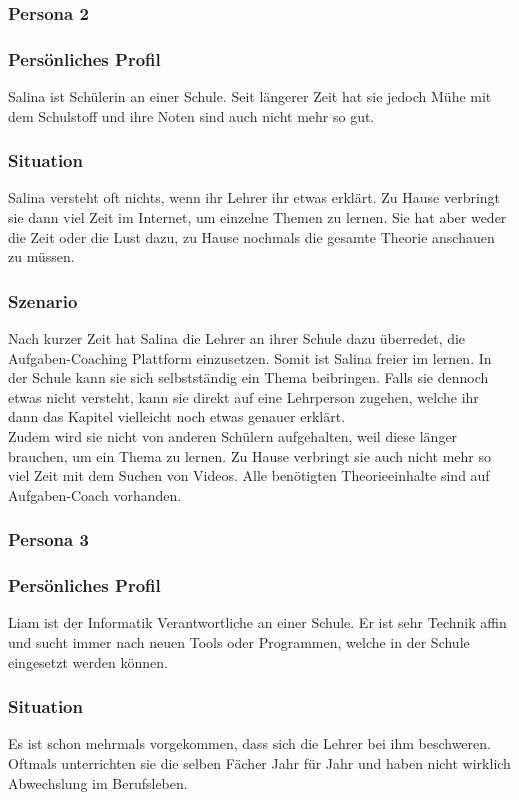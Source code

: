 \subsubsection{Persona 2}
\subsubsection*{Persönliches Profil}
Salina ist Schülerin an einer Schule. Seit längerer Zeit hat sie jedoch Mühe mit dem Schulstoff und ihre Noten sind auch nicht mehr so gut.

\subsubsection*{Situation}
Salina versteht oft nichts, wenn ihr Lehrer ihr etwas erklärt. Zu Hause verbringt sie dann viel Zeit im Internet, um einzelne Themen zu lernen. Sie hat aber weder die Zeit oder die Lust dazu, zu Hause nochmals die gesamte Theorie anschauen zu müssen.

\subsubsection*{Szenario}
Nach kurzer Zeit hat Salina die Lehrer an ihrer Schule dazu überredet, die Aufgaben-Coaching Plattform einzusetzen. Somit ist Salina freier im lernen. In der Schule kann sie sich selbstständig ein Thema beibringen. Falls sie dennoch etwas nicht versteht, kann sie direkt auf eine Lehrperson zugehen, welche ihr dann das Kapitel vielleicht noch etwas genauer erklärt. \\
Zudem wird sie nicht von anderen Schülern aufgehalten, weil diese länger brauchen, um ein Thema zu lernen. Zu Hause verbringt sie auch nicht mehr so viel Zeit mit dem Suchen von Videos. Alle benötigten Theorieeinhalte sind auf Aufgaben-Coach vorhanden.

\subsubsection{Persona 3}
\subsubsection*{Persönliches Profil}
Liam ist der Informatik Verantwortliche an einer Schule. Er ist sehr Technik affin und sucht immer nach neuen Tools oder Programmen, welche in der Schule eingesetzt werden können.

\subsubsection*{Situation}
Es ist schon mehrmals vorgekommen, dass sich die Lehrer bei ihm beschweren. Oftmals unterrichten sie die selben Fächer Jahr für Jahr und haben nicht wirklich Abwechslung im Berufsleben. 

